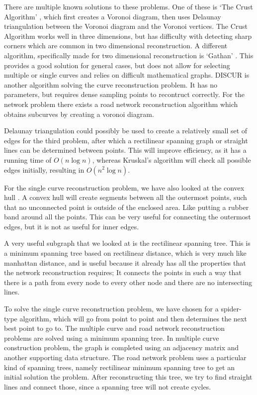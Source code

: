 \documentclass[11pt]{article}
\begin{document}
There are multiple known solutions to these problems. One of these is `The Crust Algorithm' \cite{crust}, which first creates a Voronoi diagram, then uses Delaunay triangulation between the Voronoi diagram and the Voronoi vertices. The Crust Algorithm works well in three dimensions, but has difficulty with detecting sharp corners which are common in two dimensional reconstruction.
A different algorithm, specifically made for two dimensional reconstruction is `Gathan' \cite{gathan}. This provides a good solution for general cases, but does not allow for selecting multiple or single curves and relies on difficult mathematical graphs.
DISCUR \cite{discur} is another algorithm solving the curve reconstruction problem. It has no parameters, but requires dense sampling points to recontruct correctly.
For the network problem there exists a road network reconstruction algorithm \cite{chen} which obtains subcurves by creating a voronoi diagram.

Delaunay triangulation \cite{delaunay} could possibly be used to create a relatively small set of edges for the third problem, after which a rectilinear spanning graph or straight lines can be determined between points. This will improve efficiency, as it has a running time of $O(n \log{n})$, whereas Kruskal's algorithm will check all possible edges initially, resulting in $O(n^2 \log{n})$.

For the single curve reconstruction problem, we have also looked at the convex hull \cite{convex}. A convex hull will create segments between all the outermost points, such that no unconnected point is outside of the enclosed area. Like putting a rubber band around all the points. This can be very useful for connecting the outermost edges, but it is not as useful for inner edges.

A very useful subgraph that we looked at is the rectilinear spanning tree. This is a minimum spanning tree based on rectilinear distance, which is very much like manhattan distance, and is useful because it already has all the properties that the network reconstruction requires; It connects the points in such a way that there is a path from every node to every other node and there are no intersecting lines.

To solve the single curve reconstruction problem, we have chosen for a spider-type algorithm, which will go from point to point and then determines the next best point to go to.
The multiple curve and road network reconstruction problems are solved using a minimum spanning tree. In multiple curve construction problem, the graph is completed using an adjacency matrix and another supporting data structure. The road network problem uses a particular kind of spanning trees, namely rectilinear minimum spanning tree to get an initial solution the problem. After reconstructing this tree, we try to find straight lines and connect those, since a spanning tree will not create cycles.
\end{document}
